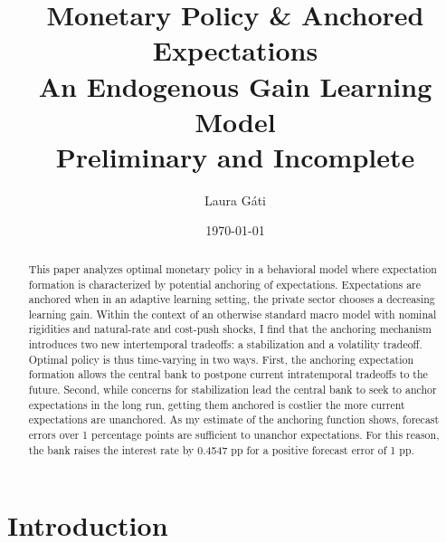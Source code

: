\documentclass[11pt]{article}
\renewcommand{\[}{\begin{equation}}
\renewcommand{\]}{\end{equation}}
\def\ppFEunanchors{1 }
\def\ppMoveFFR{0.4547 }
\begin{document}
\title{Monetary Policy \& Anchored Expectations \\
An Endogenous Gain Learning Model \\
\vspace{0.8cm}
\small{Preliminary and Incomplete}}
\author{Laura G\'ati} 
\date{\today}
\maketitle


\begin{abstract}
This paper analyzes optimal monetary policy in a behavioral model where expectation formation is characterized by potential anchoring of expectations. Expectations are anchored when in an adaptive learning setting, the private sector chooses a decreasing learning gain. Within the context of an otherwise standard macro model with nominal rigidities and natural-rate and cost-push shocks, I find that the anchoring mechanism introduces two new intertemporal tradeoffs: a stabilization and a volatility tradeoff. Optimal policy is thus time-varying in two ways. First, the anchoring expectation formation allows the central bank to postpone current intratemporal tradeoffs to the future. Second, while concerns for stabilization lead the central bank to seek to anchor expectations in the long run, getting them anchored is costlier the more current expectations are unanchored. As my estimate of the anchoring function shows, forecast errors over \ppFEunanchors percentage points are sufficient to unanchor expectations. For this reason, the bank raises the interest rate by \ppMoveFFR pp for a positive forecast error of  \ppFEunanchors pp. 
\end{abstract}





\newpage
\section{Introduction}\label{introduction}
\end{document}
